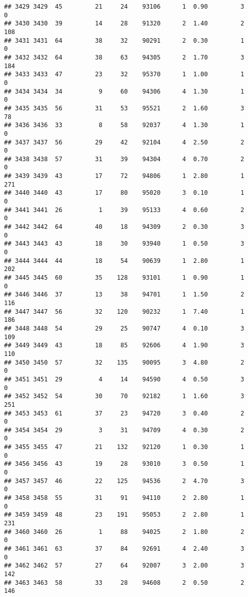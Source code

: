 \documentclass[
]{article}
\begin{document}
\begin{verbatim}
## 3429 3429  45         21     24    93106      1  0.90         3        0
## 3430 3430  39         14     28    91320      2  1.40         2      108
## 3431 3431  64         38     32    90291      2  0.30         1        0
## 3432 3432  64         38     63    94305      2  1.70         3      184
## 3433 3433  47         23     32    95370      1  1.00         1        0
## 3434 3434  34          9     60    94306      4  1.30         1        0
## 3435 3435  56         31     53    95521      2  1.60         3       78
## 3436 3436  33          8     58    92037      4  1.30         1        0
## 3437 3437  56         29     42    92104      4  2.50         2        0
## 3438 3438  57         31     39    94304      4  0.70         2        0
## 3439 3439  43         17     72    94806      1  2.80         1      271
## 3440 3440  43         17     80    95020      3  0.10         1        0
## 3441 3441  26          1     39    95133      4  0.60         2        0
## 3442 3442  64         40     18    94309      2  0.30         3        0
## 3443 3443  43         18     30    93940      1  0.50         3        0
## 3444 3444  44         18     54    90639      1  2.80         1      202
## 3445 3445  60         35    128    93101      1  0.90         1        0
## 3446 3446  37         13     38    94701      1  1.50         2      116
## 3447 3447  56         32    120    90232      1  7.40         1      186
## 3448 3448  54         29     25    90747      4  0.10         3      109
## 3449 3449  43         18     85    92606      4  1.90         3      110
## 3450 3450  57         32    135    90095      3  4.80         2        0
## 3451 3451  29          4     14    94590      4  0.50         3        0
## 3452 3452  54         30     70    92182      1  1.60         3      251
## 3453 3453  61         37     23    94720      3  0.40         2        0
## 3454 3454  29          3     31    94709      4  0.30         2        0
## 3455 3455  47         21    132    92120      1  0.30         1        0
## 3456 3456  43         19     28    93010      3  0.50         1        0
## 3457 3457  46         22    125    94536      2  4.70         3        0
## 3458 3458  55         31     91    94110      2  2.80         1        0
## 3459 3459  48         23    191    95053      2  2.80         1      231
## 3460 3460  26          1     88    94025      2  1.80         2        0
## 3461 3461  63         37     84    92691      4  2.40         3        0
## 3462 3462  57         27     64    92007      3  2.00         3      142
## 3463 3463  58         33     28    94608      2  0.50         2      146

\end{verbatim}
\end{document}
